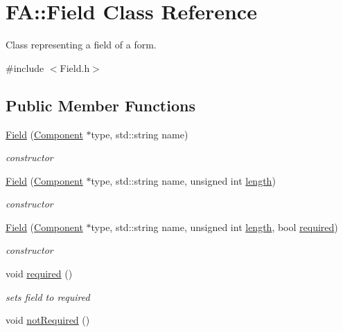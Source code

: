 \hypertarget{classFA_1_1Field}{\section{F\-A\-:\-:Field Class Reference}
\label{classFA_1_1Field}
}


Class representing a field of a form.  




{\ttfamily \#include $<$Field.\-h$>$}

\subsection*{Public Member Functions}
\begin{DoxyCompactItemize}
\item 
\hyperlink{classFA_1_1Field_ad8622732894cbeb5fd66e49dde180de9}{Field} (\hyperlink{classFA_1_1Component}{Component} $\ast$type, std\-::string name)
\begin{DoxyCompactList}\small\item\em constructor \end{DoxyCompactList}\item 
\hyperlink{classFA_1_1Field_a850c2ff25b76a0586c1fc65f7dc69960}{Field} (\hyperlink{classFA_1_1Component}{Component} $\ast$type, std\-::string name, unsigned int \hyperlink{classFA_1_1Field_a00c0f9f593c80e171f8b5d18cfd4e224}{length})
\begin{DoxyCompactList}\small\item\em constructor \end{DoxyCompactList}\item 
\hyperlink{classFA_1_1Field_a106ae367ebb20e776b996f4ff471474d}{Field} (\hyperlink{classFA_1_1Component}{Component} $\ast$type, std\-::string name, unsigned int \hyperlink{classFA_1_1Field_a00c0f9f593c80e171f8b5d18cfd4e224}{length}, bool \hyperlink{classFA_1_1Field_afe4be7775382eaae2bf0f37bd6f701f7}{required})
\begin{DoxyCompactList}\small\item\em constructor \end{DoxyCompactList}\item 
\hypertarget{classFA_1_1Field_afe4be7775382eaae2bf0f37bd6f701f7}{void \hyperlink{classFA_1_1Field_afe4be7775382eaae2bf0f37bd6f701f7}{required} ()}\label{classFA_1_1Field_afe4be7775382eaae2bf0f37bd6f701f7}

\begin{DoxyCompactList}\small\item\em sets field to required \end{DoxyCompactList}\item 
\hypertarget{classFA_1_1Field_a3b156487cab3492e0e7100561acee9e5}{void \hyperlink{classFA_1_1Field_a3b156487cab3492e0e7100561acee9e5}{not\-Required} ()}\label{classFA_1_1Field_a3b156487cab3492e0e7100561acee9e5}


\end{DoxyCompactItemize}
